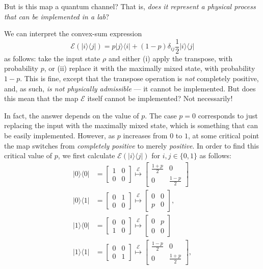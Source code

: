 \documentclass[fleqn,a4paper]{article}
\theoremstyle{definition}
\theoremstyle{definition}
\theoremstyle{definition}
\theoremstyle{definition}
\theoremstyle{remark}
\begin{document}
But is this map a quantum channel?
That is, \emph{does it represent a physical process that can be implemented in a lab}?

We can interpret the convex-sum expression
\[
  \mathcal{E}(|i\rangle\langle j|)
  = p|j\rangle\langle i|+(1-p)\delta_{ij} \frac{1}{2}|i\rangle\langle j|
\]
as follows: take the input state \(\rho\) and either (i) apply the transpose, with probability \(p\), or (ii) replace it with the maximally mixed state, with probability \(1-p\).
This is fine, except that the transpose operation is \emph{not} completely positive, and, as such, \emph{is not physically admissible} --- it cannot be implemented.
But does this mean that the map \(\mathcal{E}\) itself cannot be implemented?
Not necessarily!

In fact, the answer depends on the value of \(p\).
The case \(p=0\) corresponds to just replacing the input with the maximally mixed state, which is something that can be easily implemented.
However, as \(p\) increases from \(0\) to \(1\), at some critical point the map switches from \emph{completely positive} to merely \emph{positive}.
In order to find this critical value of \(p\), we first calculate \(\mathcal{E} (|i\rangle\langle j|)\) for \(i,j\in\{0,1\}\) as follows:
\[
  \begin{aligned}
    |0\rangle\langle 0|
    &= \begin{bmatrix}1&0\\0&0\end{bmatrix}
    \overset{\mathcal{E}}{\longmapsto}
    \begin{bmatrix}\frac{1+p}{2}&0\\0&\frac{1-p}{2}\end{bmatrix}
  \\|0\rangle\langle 1|
    &= \begin{bmatrix}0&1\\0&0\end{bmatrix}
    \overset{\mathcal{E}}{\longmapsto}
    \begin{bmatrix}0&0\\p&0\end{bmatrix},
  \\|1\rangle\langle 0|
    &= \begin{bmatrix}0&0\\1&0\end{bmatrix}
    \overset{\mathcal{E}}{\longmapsto}
    \begin{bmatrix}0&p\\0&0\end{bmatrix}
  \\|1\rangle\langle 1|
    &= \begin{bmatrix}0&0\\0&1\end{bmatrix}
    \overset{\mathcal{E}}{\longmapsto}
    \begin{bmatrix}\frac{1-p}{2}&0\\0&\frac{1+p}{2}\end{bmatrix},
  \end{aligned}
\]
\end{document}
